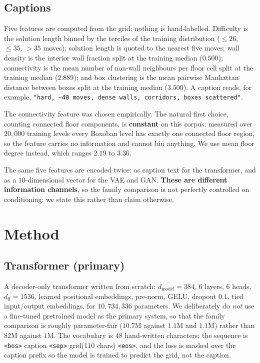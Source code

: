 \documentclass[conference]{IEEEtran}
\begin{document}
\subsection{Captions}
Five features are computed from the grid; nothing is hand-labelled. Difficulty
is the solution length binned by the terciles of the training distribution
($\leq26$, $\leq35$, $>35$ moves); solution length is quoted to the nearest five
moves; wall density is the interior wall fraction split at the training median
($0.500$); connectivity is the mean number of non-wall neighbours per floor cell
split at the training median ($2.889$); and box clustering is the mean pairwise
Manhattan distance between boxes split at the training median ($3.500$). A
caption reads, for example, \texttt{"hard, \textasciitilde40 moves, dense walls,
corridors, boxes scattered"}.

The connectivity feature was chosen empirically. The natural first choice,
counting connected floor components, is \textbf{constant} on this corpus:
measured over $20{,}000$ training levels every Boxoban level has exactly one
connected floor region, so the feature carries no information and cannot bin
anything. We use mean floor degree instead, which ranges $2.19$ to $3.36$.

The same five features are encoded twice: as caption text for the transformer,
and as a $10$-dimensional vector for the VAE and GAN. \textbf{These are different
information channels}, so the family comparison is not perfectly controlled on
conditioning; we state this rather than claim otherwise.

\section{Method}
\label{sec:method}

\subsection{Transformer (primary)}
A decoder-only transformer written from scratch: $d_{\text{model}}=384$, $6$
layers, $6$ heads, $d_{\text{ff}}=1536$, learned positional embeddings,
pre-norm, GELU, dropout $0.1$, tied input/output embeddings, for $10{,}734{,}336$
parameters. We deliberately do \emph{not} use a fine-tuned pretrained model as
the primary system, so that the family comparison is roughly parameter-fair
($10.7$M against $1.1$M and $1.1$M) rather than $82$M against $1$M. The
vocabulary is $48$ hand-written characters; the sequence is
\texttt{<bos>} caption \texttt{<sep>} grid($110$ chars) \texttt{<eos>}, and the
loss is masked over the caption prefix so the model is trained to predict the
grid, not the caption.
\end{document}
